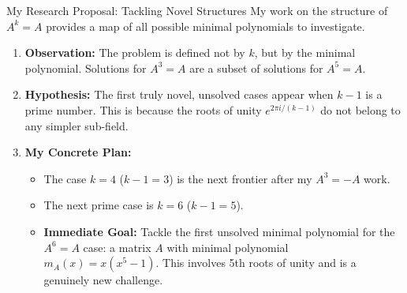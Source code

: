 \documentclass{beamer}
\begin{document}
\begin{frame}{My Research Proposal: Tackling Novel Structures}
  My work on the structure of $A^k=A$ provides a map of all possible minimal polynomials to investigate.
  \begin{enumerate}
    \item \textbf{Observation:} The problem is defined not by $k$, but by the minimal polynomial. Solutions for $A^3=A$ are a subset of solutions for $A^5=A$.
    \pause
    \item \textbf{Hypothesis:} The first truly novel, unsolved cases appear when $k-1$ is a prime number. This is because the roots of unity $e^{2\pi i / (k-1)}$ do not belong to any simpler sub-field.
    \pause
    \item \textbf{My Concrete Plan:}
    \begin{itemize}
        \item The case $k=4$ ($k-1=3$) is the next frontier after my $A^3=-A$ work.
        \item The next prime case is $k=6$ ($k-1=5$).
        \item \textbf{Immediate Goal:} Tackle the first unsolved minimal polynomial for the $A^6=A$ case: a matrix $A$ with minimal polynomial $m_A(x) = x(x^5-1)$. This involves 5th roots of unity and is a genuinely new challenge.
    \end{itemize}
  \end{enumerate}
\end{frame}

\end{document}
